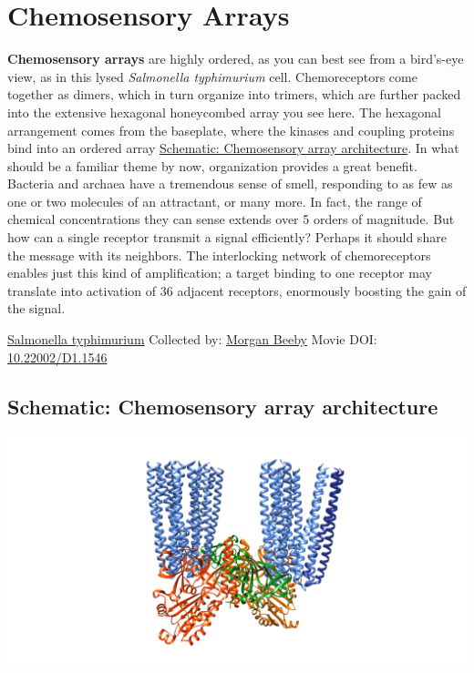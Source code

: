 \documentclass[]{tufte-book}
\begin{document}
\hypertarget{chemosensory-arrays}{%
\section{Chemosensory Arrays}\label{chemosensory-arrays}}

\textbf{Chemosensory arrays} are highly ordered, as you can best see from a bird's-eye view, as in this lysed \emph{Salmonella typhimurium} cell. Chemoreceptors come together as dimers, which in turn organize into trimers, which are further packed into the extensive hexagonal honeycombed array you see here. The hexagonal arrangement comes from the baseplate, where the kinases and coupling proteins bind into an ordered array \protect\hyperlink{Chemosensory_array_architecture}{Schematic: Chemosensory array architecture}. In what should be a familiar theme by now, organization provides a great benefit. Bacteria and archaea have a tremendous sense of smell, responding to as few as one or two molecules of an attractant, or many more. In fact, the range of chemical concentrations they can sense extends over 5 orders of magnitude. But how can a single receptor transmit a signal efficiently? Perhaps it should share the message with its neighbors. The interlocking network of chemoreceptors enables just this kind of amplification; a target binding to one receptor may translate into activation of 36 adjacent receptors, enormously boosting the gain of the signal.



\hypertarget{htmlwidget-759012b421c8eb950dde}{}

\label{fig:7-2}\protect\hyperlink{tree}{Salmonella typhimurium} Collected by: \protect\hyperlink{morgan_beeby}{Morgan Beeby} Movie DOI: \href{https://doi.org/10.22002/D1.1546}{10.22002/D1.1546}

\hypertarget{Chemosensory_array_architecture}{%
\subsection*{Schematic: Chemosensory array architecture}\label{Chemosensory_array_architecture}}

\includegraphics{img/schematics/7_2_1}
\end{document}
